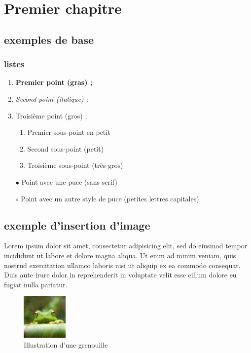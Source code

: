 \chapter{Premier chapitre}
\section{exemples de base}

\subsection{listes}

\begin{enumerate}
  \item {\bf Premier point (gras) ;}
  \item {\em Second point (italique) ;}
  \item {\Large Troisième point (gros) ;}
      \begin{enumerate}
          \item {\small Premier sous-point en petit}
          \item {\tiny Second sous-point (petit)}
          \item {\Huge Troisième sous-point (très gros)}
      \end{enumerate}
      
  \item[$\bullet$] {\sf Point avec une puce (sans serif)}
  \item[$\circ$] {\sc Point avec un autre style de puce (petites lettres capitales)}
\end{enumerate}


\section{exemple d'insertion d'image}
Lorem ipsum dolor sit amet, consectetur adipisicing elit, sed do eiusmod tempor incididunt ut
labore et dolore magna aliqua. Ut enim ad minim veniam, quis nostrud exercitation ullamco
laboris nisi ut aliquip ex ea commodo consequat. Duis aute irure dolor in reprehenderit in
voluptate velit esse cillum dolore eu fugiat nulla pariatur. 
\begin{figure}[h]
    \centering
    \includegraphics[width=0.2\textwidth]{images/frog.jpg}
    \caption{Illustration d'une grenouille}
    \label{fig:frog1}
\end{figure}

